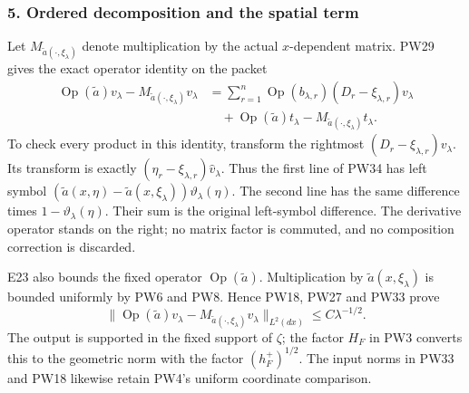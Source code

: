 \documentclass[
  11pt,
]{article}
\makeatletter
\let\ReaderOriginalAnchorStart\hyper@anchorstart
\let\ReaderOriginalAnchorEnd\hyper@anchorend
\let\ReaderPendingAliases\@empty
\def\ReaderArmAliases#1{\gdef\ReaderPendingAliases{#1}}
\def\hyper@anchorstart#1{\ReaderIfNativeAnchorTF{#1}{\ReaderPendingAliases\global\let\ReaderPendingAliases\@empty}{}\ReaderOriginalAnchorStart{#1}}
\makeatother
\begin{document}
\ReaderArmAliases{\ReaderOriginalAnchorStart{5-ordered-decomposition-and-the-spatial-term}\ReaderOriginalAnchorEnd\begingroup\expandafter\def\csname @currentHref\endcsname{5-ordered-decomposition-and-the-spatial-term}\label{5-ordered-decomposition-and-the-spatial-term}\endgroup}
\subsubsection{5. Ordered decomposition and the spatial
term}\label{ordered-decomposition-and-the-spatial-term}

Let \(M_{\widetilde a(\cdot,\xi_\lambda)}\) denote multiplication by the
actual \(x\)-dependent matrix. PW29 gives the exact operator identity on
the packet \[
 \begin{split}
 \operatorname{Op}(\widetilde a)v_\lambda
       -M_{\widetilde a(\cdot,\xi_\lambda)}v_\lambda
 &=\sum_{r=1}^n
       \operatorname{Op}(b_{\lambda,r})
          (D_r-\xi_{\lambda,r})v_\lambda\\
 &\quad{}+\operatorname{Op}(\widetilde a)t_\lambda
       -M_{\widetilde a(\cdot,\xi_\lambda)}t_\lambda .
 \end{split}
 \tag{PW34}
\] To check every product in this identity, transform the rightmost
\((D_r-\xi_{\lambda,r})v_\lambda\). Its transform is exactly
\((\eta_r-\xi_{\lambda,r})\widehat v_\lambda\). Thus the first line of
PW34 has left symbol
\((\widetilde a(x,\eta)-\widetilde a(x,\xi_\lambda))
\vartheta_\lambda(\eta)\). The second line has the same difference times
\(1-\vartheta_\lambda(\eta)\). Their sum is the original left-symbol
difference. The derivative operator stands on the right; no matrix
factor is commuted, and no composition correction is discarded.

E23 also bounds the fixed operator \(\operatorname{Op}(\widetilde a)\).
Multiplication by \(\widetilde a(x,\xi_\lambda)\) is bounded uniformly
by PW6 and PW8. Hence PW18, PW27 and PW33 prove \[
 \|\operatorname{Op}(\widetilde a)v_\lambda
       -M_{\widetilde a(\cdot,\xi_\lambda)}v_\lambda\|_{L^2(dx)}
       \leq C\lambda^{-1/2}.
 \tag{PW35}
\] The output is supported in the fixed support of \(\zeta\); the factor
\(H_F\) in PW3 converts this to the geometric norm with the factor
\((h_F^+)^{1/2}\). The input norms in PW33 and PW18 likewise retain
PW4's uniform coordinate comparison.
\end{document}
